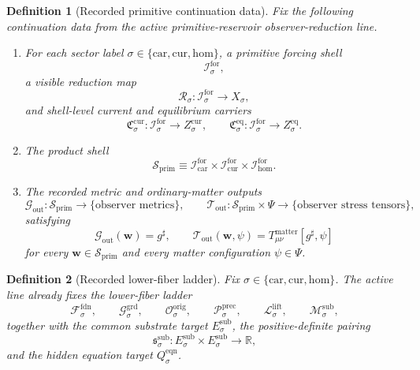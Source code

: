 \documentclass[11pt]{article}
\newcommand{\CompletedMetric}{g^{\sharp}}
\newcommand{\MatterSpace}{\Psi}
\newcommand{\Car}{\mathrm{car}}
\newcommand{\Cur}{\mathrm{cur}}
\newcommand{\Hom}{\mathrm{hom}}
\newcommand{\ForSpace}[1]{\mathcal I_{#1}^{\mathrm{for}}}
\newcommand{\PrimShell}{\mathcal S_{\mathrm{prim}}}
\newcommand{\Reduction}[1]{\mathcal R_{#1}}
\newcommand{\CurrentCarrier}[1]{\mathfrak C_{#1}^{\mathrm{cur}}}
\newcommand{\EqCarrier}[1]{\mathfrak C_{#1}^{\mathrm{eq}}}
\newcommand{\MetricOut}{\mathscr G_{\mathrm{out}}}
\newcommand{\MatterOut}{\mathscr T_{\mathrm{out}}}
\newcommand{\FoundSpace}[1]{\mathcal F_{#1}^{\mathrm{fdn}}}
\newcommand{\GroundSpace}[1]{\mathcal G_{#1}^{\mathrm{grd}}}
\newcommand{\OrigSpace}[1]{\mathcal O_{#1}^{\mathrm{orig}}}
\newcommand{\PrecSpace}[1]{\mathcal P_{#1}^{\mathrm{prec}}}
\newcommand{\LiftSpace}[1]{\mathcal L_{#1}^{\mathrm{lift}}}
\newcommand{\SubSpace}[1]{\mathcal M_{#1}^{\mathrm{sub}}}
\newcommand{\SubTarget}[1]{E_{#1}^{\mathrm{sub}}}
\newcommand{\SubPair}[1]{\mathfrak s_{#1}^{\mathrm{sub}}}
\newcommand{\EqnTarget}[1]{Q_{#1}^{\mathrm{eqn}}}
\newtheorem{definition}{Definition}
\begin{document}
\begin{definition}[Recorded primitive continuation data]
\label{def:fixed}
Fix the following continuation data from the active primitive-reservoir observer-reduction line.
\begin{enumerate}
    \item For each sector label \(\sigma\in\{\Car,\Cur,\Hom\}\), a primitive forcing shell
    \[
    \ForSpace{\sigma},
    \]
    a visible reduction map
    \[
    \Reduction{\sigma}:\ForSpace{\sigma}\to X_{\sigma},
    \]
    and shell-level current and equilibrium carriers
    \[
    \CurrentCarrier{\sigma}:\ForSpace{\sigma}\to Z_{\sigma}^{\mathrm{cur}},
    \qquad
    \EqCarrier{\sigma}:\ForSpace{\sigma}\to Z_{\sigma}^{\mathrm{eq}}.
    \]
    \item The product shell
    \[
    \PrimShell
    \equiv
    \ForSpace{\Car}\times \ForSpace{\Cur}\times \ForSpace{\Hom}.
    \]
    \item The recorded metric and ordinary-matter outputs
    \[
    \MetricOut:\PrimShell\to\{\text{observer metrics}\},
    \qquad
    \MatterOut:\PrimShell\times\MatterSpace\to\{\text{observer stress tensors}\},
    \]
    satisfying
    \begin{equation}
    \MetricOut(\mathbf w)=\CompletedMetric,
    \qquad
    \MatterOut(\mathbf w,\psi)
    =
    T_{\mu\nu}^{\mathrm{matter}}[\CompletedMetric,\psi]
    \label{eq:fixedoutputs}
    \end{equation}
    for every \(\mathbf w\in\PrimShell\) and every matter configuration \(\psi\in\MatterSpace\).
\end{enumerate}
\end{definition}

\begin{definition}[Recorded lower-fiber ladder]
\label{def:ladder}
Fix \(\sigma\in\{\Car,\Cur,\Hom\}\). The active line already fixes the lower-fiber ladder
\[
\FoundSpace{\sigma},
\qquad
\GroundSpace{\sigma},
\qquad
\OrigSpace{\sigma},
\qquad
\PrecSpace{\sigma},
\qquad
\LiftSpace{\sigma},
\qquad
\SubSpace{\sigma},
\]
together with the common substrate target \(\SubTarget{\sigma}\), the positive-definite pairing
\[
\SubPair{\sigma}:
\SubTarget{\sigma}\times\SubTarget{\sigma}\to\mathbb R,
\]
and the hidden equation target \(\EqnTarget{\sigma}\).
\end{definition}
\end{document}
